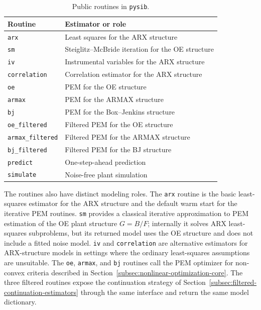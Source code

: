 \documentclass[acmsmall,screen,review]{acmart}
\begin{document}
\begin{table}[t]
    \caption{Public routines in \texttt{pysib}.}
    \label{tab:public-api}
    \centering
    \footnotesize
    \setlength{\tabcolsep}{4pt}
    \begin{tabular}{p{}p{}}
        \toprule
        Routine & Estimator or role \\
        \midrule
        \texttt{arx} & Least squares for the ARX structure \\
        \texttt{sm} & Steiglitz--McBride iteration for the OE structure \\
        \texttt{iv} & Instrumental variables for the ARX structure \\
        \texttt{correlation} & Correlation estimator for the ARX structure \\
        \texttt{oe} & PEM for the OE structure \\
        \texttt{armax} & PEM for the ARMAX structure \\
        \texttt{bj} & PEM for the Box--Jenkins structure \\
        \texttt{oe\_filtered} & Filtered PEM for the OE structure \\
        \texttt{armax\_filtered} & Filtered PEM for the ARMAX structure \\
        \texttt{bj\_filtered} & Filtered PEM for the BJ structure \\
        \texttt{predict} & One-step-ahead prediction \\
        \texttt{simulate} & Noise-free plant simulation \\
        \bottomrule
    \end{tabular}
\end{table}

The routines also have distinct modeling roles.  The \texttt{arx} routine is
the basic least-squares estimator for the ARX structure and the default warm
start for the iterative PEM routines.  \texttt{sm} provides a classical
iterative approximation to PEM estimation of the OE plant structure \(G=B/F\);
internally it solves ARX least-squares subproblems, but its returned model uses
the OE structure and does not include a fitted noise model.  \texttt{iv} and
\texttt{correlation} are alternative estimators for ARX-structure models in
settings where the ordinary least-squares assumptions are unsuitable.
The \texttt{oe}, \texttt{armax}, and \texttt{bj} routines call the PEM
optimizer for non-convex criteria described in
Section~\ref{subsec:nonlinear-optimization-core}.
The three filtered routines expose the continuation strategy of
Section~\ref{subsec:filtered-continuation-estimators} through the same
interface and return the same model dictionary.
\end{document}
